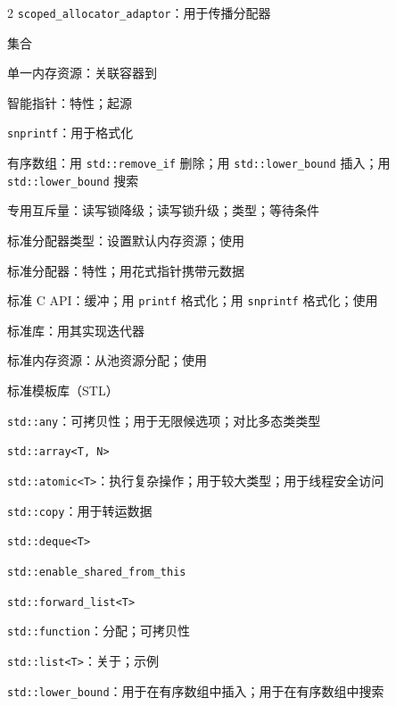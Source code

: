 \begin{multicols}{2}
\noindent \texttt{scoped\_\allowbreak{}allocator\_\allowbreak{}adaptor}：用于传播分配器\par
\noindent 集合\par
\noindent 单一内存资源：关联容器到\par
\noindent 智能指针：特性；起源\par
\noindent \texttt{snprintf}：用于格式化\par
\noindent 有序数组：用 \texttt{std::\allowbreak{}remove\_\allowbreak{}if} 删除；用 \texttt{std::\allowbreak{}lower\_\allowbreak{}bound} 插入；用 \texttt{std::\allowbreak{}lower\_\allowbreak{}bound} 搜索\par
\noindent 专用互斥量：读写锁降级；读写锁升级；类型；等待条件\par
\noindent 标准分配器类型：设置默认内存资源；使用\par
\noindent 标准分配器：特性；用花式指针携带元数据\par
\noindent 标准 C API：缓冲；用 \texttt{printf} 格式化；用 \texttt{snprintf} 格式化；使用\par
\noindent 标准库：用其实现迭代器\par
\noindent 标准内存资源：从池资源分配；使用\par
\noindent 标准模板库（STL）\par
\noindent \texttt{std::\allowbreak{}any}：可拷贝性；用于无限候选项；对比多态类类型\par
\noindent \texttt{std::\allowbreak{}array<\allowbreak{}T,\allowbreak{} N>\allowbreak{}}\par
\noindent \texttt{std::\allowbreak{}atomic<\allowbreak{}T>\allowbreak{}}：执行复杂操作；用于较大类型；用于线程安全访问\par
\noindent \texttt{std::\allowbreak{}copy}：用于转运数据\par
\noindent \texttt{std::\allowbreak{}deque<\allowbreak{}T>\allowbreak{}}\par
\noindent \texttt{std::\allowbreak{}enable\_\allowbreak{}shared\_\allowbreak{}from\_\allowbreak{}this}\par
\noindent \texttt{std::\allowbreak{}forward\_\allowbreak{}list<\allowbreak{}T>\allowbreak{}}\par
\noindent \texttt{std::\allowbreak{}function}：分配；可拷贝性\par
\noindent \texttt{std::\allowbreak{}list<\allowbreak{}T>\allowbreak{}}：关于；示例\par
\noindent \texttt{std::\allowbreak{}lower\_\allowbreak{}bound}：用于在有序数组中插入；用于在有序数组中搜索\par

\end{multicols}
